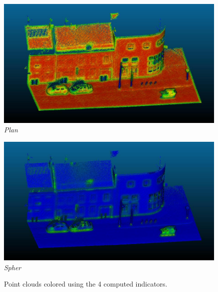 \documentclass[french]{article}
\begin{document}
\begin{figure}[h]
		\begin{minipage}{0.49\linewidth}
		\centering
		\includegraphics[width=\linewidth]{q5-plan.jpg}
		\textit{Plan}
	\end{minipage}\hfill
	\begin{minipage}{0.49\linewidth}
		\centering
		\includegraphics[width=\linewidth]{q5-spher.jpg}
		\textit{Spher}
	\end{minipage}
	\caption{Point clouds colored using the 4 computed indicators.}
	\label{fig:q5}
\end{figure}
\end{document}
